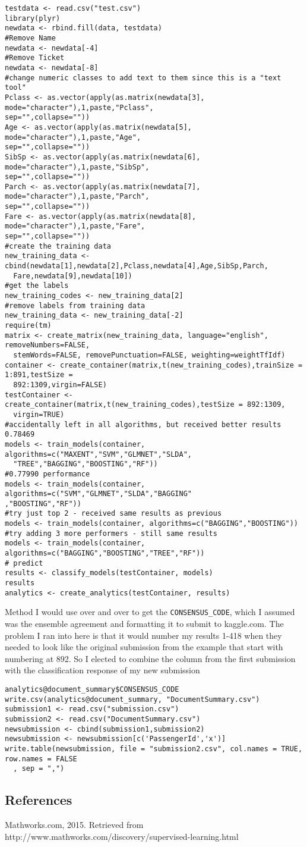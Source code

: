\documentclass[10pt]{article}
\begin{document}
\begin{verbatim}
testdata <- read.csv("test.csv")
library(plyr)
newdata <- rbind.fill(data, testdata)
#Remove Name
newdata <- newdata[-4]
#Remove Ticket
newdata <- newdata[-8]
#change numeric classes to add text to them since this is a "text tool"
Pclass <- as.vector(apply(as.matrix(newdata[3], mode="character"),1,paste,"Pclass",
sep="",collapse=""))
Age <- as.vector(apply(as.matrix(newdata[5], mode="character"),1,paste,"Age",
sep="",collapse=""))
SibSp <- as.vector(apply(as.matrix(newdata[6], mode="character"),1,paste,"SibSp",
sep="",collapse=""))
Parch <- as.vector(apply(as.matrix(newdata[7], mode="character"),1,paste,"Parch",
sep="",collapse=""))
Fare <- as.vector(apply(as.matrix(newdata[8], mode="character"),1,paste,"Fare",
sep="",collapse=""))
#create the training data
new_training_data <- cbind(newdata[1],newdata[2],Pclass,newdata[4],Age,SibSp,Parch,
  Fare,newdata[9],newdata[10])
#get the labels
new_training_codes <- new_training_data[2]
#remove labels from training data
new_training_data <- new_training_data[-2]
require(tm)
matrix <- create_matrix(new_training_data, language="english", removeNumbers=FALSE, 
  stemWords=FALSE, removePunctuation=FALSE, weighting=weightTfIdf)
container <- create_container(matrix,t(new_training_codes),trainSize = 1:891,testSize = 
  892:1309,virgin=FALSE)
testContainer <- create_container(matrix,t(new_training_codes),testSize = 892:1309,
  virgin=TRUE)
#accidentally left in all algorithms, but received better results 0.78469
models <- train_models(container, algorithms=c("MAXENT","SVM","GLMNET","SLDA",
  "TREE","BAGGING","BOOSTING","RF"))
#0.77990 performance
models <- train_models(container, algorithms=c("SVM","GLMNET","SLDA","BAGGING"
,"BOOSTING","RF"))
#try just top 2 - received same results as previous
models <- train_models(container, algorithms=c("BAGGING","BOOSTING"))
#try adding 3 more performers - still same results
models <- train_models(container, algorithms=c("BAGGING","BOOSTING","TREE","RF"))
# predict
results <- classify_models(testContainer, models)
results
analytics <- create_analytics(testContainer, results)
\end{verbatim}
Method I would use over and over to get the \verb|CONSENSUS_CODE|, which I assumed was the ensemble agreement and formatting it to submit to kaggle.com. The problem I ran into here is that it would number my results 1-418 when they needed to look like the original submission from the example that start with numbering at 892. So I elected to combine the column from the first submission with the classification response of my new submission
\begin{verbatim}
analytics@document_summary$CONSENSUS_CODE
write.csv(analytics@document_summary, "DocumentSummary.csv")
submission1 <- read.csv("submission.csv")
submission2 <- read.csv("DocumentSummary.csv")
newsubmission <- cbind(submission1,submission2)
newsubmission <- newsubmission[c('PassengerId','x')]
write.table(newsubmission, file = "submission2.csv", col.names = TRUE, row.names = FALSE
  , sep = ",")
\end{verbatim}
\subsection*{References}
Mathworks.com, 2015. Retrieved from http://www.mathworks.com/discovery/supervised-learning.html
\end{document}
